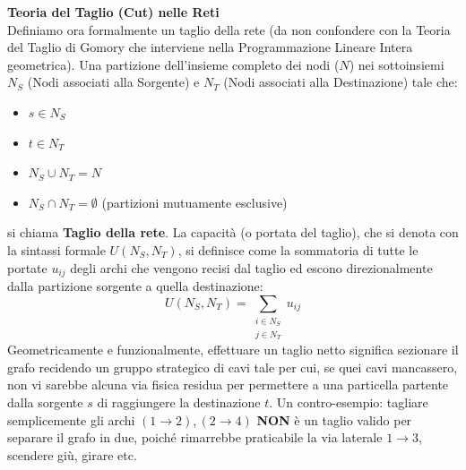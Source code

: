 \documentclass[12pt, a4paper]{article}
\newcommand{\separatore}{\noindent{\color{titlecolor!50}\rule{\textwidth}{0.6pt}}}
\begin{document}
	\vspace{0.6cm}
	\separatore
	\vspace{0.4cm}
	
	\textbf{Teoria del Taglio (Cut) nelle Reti}\\
	Definiamo ora formalmente un taglio della rete (da non confondere con la Teoria del Taglio di Gomory che interviene nella Programmazione Lineare Intera geometrica).
	Una partizione dell'insieme completo dei nodi ($N$) nei sottoinsiemi $N_S$ (Nodi associati alla Sorgente) e $N_T$ (Nodi associati alla Destinazione) tale che:
	\begin{itemize}
		\item $s \in N_S$
		\item $t \in N_T$
		\item $N_S \cup N_T = N$
		\item $N_S \cap N_T = \emptyset$ (partizioni mutuamente esclusive)
	\end{itemize}
	si chiama \textbf{Taglio della rete}. 
	La capacità (o portata del taglio), che si denota con la sintassi formale $U(N_S, N_T)$, si definisce come la sommatoria di tutte le portate $u_{ij}$ degli archi che vengono recisi dal taglio ed escono direzionalmente dalla partizione sorgente a quella destinazione:
	\[
	U(N_S, N_T) = \sum_{\substack{i \in N_S \\ j \in N_T}} u_{ij}
	\]
	Geometricamente e funzionalmente, effettuare un taglio netto significa sezionare il grafo recidendo un gruppo strategico di cavi tale per cui, se quei cavi mancassero, non vi sarebbe alcuna via fisica residua per permettere a una particella partente dalla sorgente $s$ di raggiungere la destinazione $t$.
	Un contro-esempio: tagliare semplicemente gli archi $(1\to2), (2\to4)$ \textbf{NON} è un taglio valido per separare il grafo in due, poiché rimarrebbe praticabile la via laterale $1\to3$, scendere giù, girare etc.
	
\end{document}
